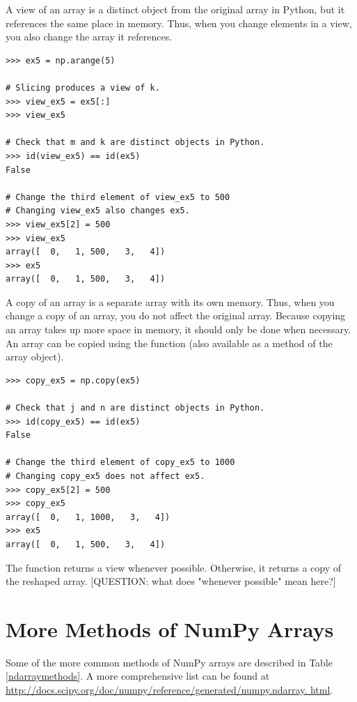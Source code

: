 A view of an array is a distinct object from the original array in Python, but it references the same place in memory. Thus, when you change elements in a view, you also change the array it references.
\begin{lstlisting}
>>> ex5 = np.arange(5)

# Slicing produces a view of k. 
>>> view_ex5 = ex5[:]
>>> view_ex5

# Check that m and k are distinct objects in Python.
>>> id(view_ex5) == id(ex5) 
False

# Change the third element of view_ex5 to 500
# Changing view_ex5 also changes ex5.
>>> view_ex5[2] = 500 
>>> view_ex5
array([  0,   1, 500,   3,   4])
>>> ex5 
array([  0,   1, 500,   3,   4])
\end{lstlisting} 

A copy of an array is a separate array with its own memory. Thus, when you change a copy of an array, you do not affect the original array. Because copying an array takes up more space in memory, it should only be done when necessary. An array can
be copied using the  function (also available as a method of 
the array object). 

\begin{lstlisting}
>>> copy_ex5 = np.copy(ex5) 

# Check that j and n are distinct objects in Python.
>>> id(copy_ex5) == id(ex5) 
False

# Change the third element of copy_ex5 to 1000
# Changing copy_ex5 does not affect ex5.
>>> copy_ex5[2] = 500 
>>> copy_ex5
array([  0,   1, 1000,   3,   4])
>>> ex5
array([  0,   1, 500,   3,   4])
\end{lstlisting} 

The function  returns a view whenever possible. Otherwise, it returns a copy of the reshaped array. [QUESTION: what does "whenever possible" mean here?]


\section*{More Methods of NumPy Arrays} 
Some of the more common methods of NumPy arrays are described in Table \ref{ndarraymethods}. A more comprehensive list can be found at
\url{http://docs.scipy.org/doc/numpy/reference/generated/numpy.ndarray.
html}.

